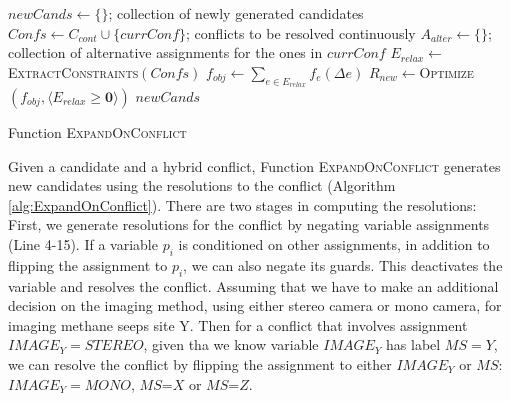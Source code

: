 \documentclass[jair,twoside,11pt,theapa]{article}
\begin{document}
\begin{algorithm}[h!]
	
	\SetAlgoLined
	\Indm
	\Initialize{}
	\Indp
	{$\mathit{newCands}\leftarrow \{\}$}; collection of newly generated candidates\;
	{$\mathit{Confs}\leftarrow C_{cont}\cup \{\mathit{currConf}\}$; conflicts to be resolved
		continuously}\;
	{$A_{alter}\leftarrow \{\}$}; collection of alternative assignments for the ones in $\mathit{currConf}$\;
	\Indm
	\Algorithm{}
	\Indp
	$E_{relax}\leftarrow$\textsc{ExtractConstraints}$(\mathit{Confs})$\;
	$f_{obj}\leftarrow\sum_{e\in E_{relax}}f_e(\Delta e)$\;
	$R_{new}\leftarrow$\textsc{Optimize}$(f_{obj},\langle
	E_{relax}\geq \textbf{0}\rangle )$\;
	\Return $\mathit{newCands}$\;
	\caption{Function \textsc{ExpandOnConflict}}
	\label{alg:ExpandOnConflict}
\end{algorithm}



Given a candidate and a hybrid conflict, Function \textsc{ExpandOnConflict} generates
new candidates using the resolutions to the conflict (Algorithm
\ref{alg:ExpandOnConflict}). There are two stages in computing the resolutions:
First, we generate resolutions for the conflict by negating variable assignments
(Line 4-15). If a variable $p_i$ is conditioned on other assignments, in
addition to flipping the assignment to $p_i$, we can also negate its guards. This
deactivates the variable and resolves the conflict. Assuming that we have to make an additional decision on the imaging method, using either stereo camera or mono camera, for imaging methane seeps site Y. Then for a conflict that involves assignment $\mathit{IMAGE_Y=STEREO}$, given tha we know variable $\mathit{IMAGE_Y}$ has label $MS=Y$, we can resolve the conflict by flipping the assignment to either $\mathit{IMAGE_Y}$ or $MS$: $\mathit{IMAGE_Y=MONO}$, $MS$=$X$ or $MS$=$Z$.
\end{document}
